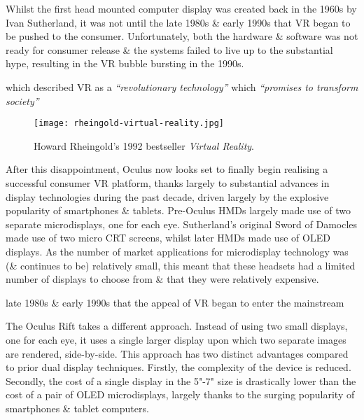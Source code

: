 




Whilst the first head mounted computer display was created back in the 1960s by Ivan Sutherland, it was not until the late 1980s \& early 1990s that VR began to be pushed to the consumer. Unfortunately, both the hardware \& software was not ready for consumer release \& the systems failed to live up to the substantial hype, resulting in the VR bubble bursting in the 1990s.


which described VR as a \textit{``revolutionary technology''} which \textit{``promises to transform society''}

\begin{figure}[h]
	\begin{center}
		\texttt{[image: rheingold-virtual-reality.jpg]}
		\caption{Howard Rheingold's 1992 bestseller \textit{Virtual Reality}.}
		\label{rheingold-virtual-reality.jpg}
	\end{center}
\end{figure}

After this disappointment, Oculus now looks set to finally begin realising a successful consumer VR platform, thanks largely to substantial advances in display technologies during the past decade, driven largely by the explosive popularity of smartphones \& tablets. Pre-Oculus HMDs largely made use of two separate microdisplays, one for each eye. Sutherland's original Sword of Damocles made use of two micro CRT screens, whilst later HMDs made use of OLED displays. As the number of market applications for microdisplay technology was (\& continues to be) relatively small, this meant that these headsets had a limited number of displays to choose from \& that they were relatively expensive.




late 1980s \& early 1990s that the appeal of VR began to enter the mainstream



The Oculus Rift takes a different approach. Instead of using two small displays, one for each eye, it uses a single larger display upon which two separate images are rendered, side-by-side. This approach has two distinct advantages compared to prior dual display techniques. Firstly, the complexity of the device is reduced. Secondly, the cost of a single display in the 5"-7" size is drastically lower than the cost of a pair of OLED microdisplays, largely thanks to the surging popularity of smartphones \& tablet computers.


